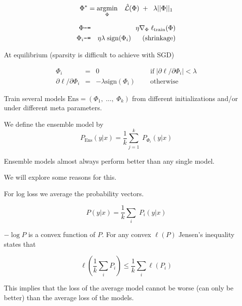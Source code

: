 {$$\Phi^* = \operatorname*{argmin}_\Phi \; \;\;\hat{\cal L}(\Phi) \;+ \; \;\lambda||\Phi||_1$$

\begin{eqnarray*}
  \Phi & \mbox{\tt -=} & \eta \nabla_\Phi \; \ell_{\mathrm{train}}(\Phi) \\
  \Phi_i & \mbox{\tt -=} & \eta\lambda\; \mathrm{sign}(\Phi_i) \;\;\;\;\;\;\mbox{(shrinkage)}
\end{eqnarray*}

\vfill
At equilibrium \hfill (sparsity is difficult to achieve with SGD)

$$\begin{array}{rcll}
\Phi_i &  = & 0  & \;\;\;\;\;\mbox{if} \;\left|\partial \ell /\partial \Phi_i\right| <  \lambda \\
\partial \ell /\partial \Phi_i & = &  -\lambda \mathrm{sign}(\Phi_i) &\;\;\;\;\; \mbox{otherwise}
\end{array}$$



Train several models $\mathrm{Ens} = (\Phi_1,\;\ldots,\; \Phi_k)$ from different initializations and/or under different meta parameters.

\vfill
We define the ensemble model by
$$P_\mathrm{Ens}(y|x) = \frac{1}{k} \sum_{j=1}^k\; P_{\Phi_i}(y|x)$$

\vfill
Ensemble models almost always perform better than any single model.

\vfill
We will explore some reasons for this.


\vfill
{}

For log loss we average the probability vectors.

\vfill
$$P(y|x) = \frac{1}{k} \sum_i \;P_i(y|x)$$

\vfill
$- \log P$ is a convex function of $P$.  For any convex $\ell(P)$ Jensen's inequality states that

$$\ell\left(\frac{1}{k} \sum_i P_i\right) \leq \frac{1}{k} \sum_i \ell(P_i)$$

\vfill
This implies that the loss of the average model cannot be worse (can only be better) than the average loss of the models.


}
